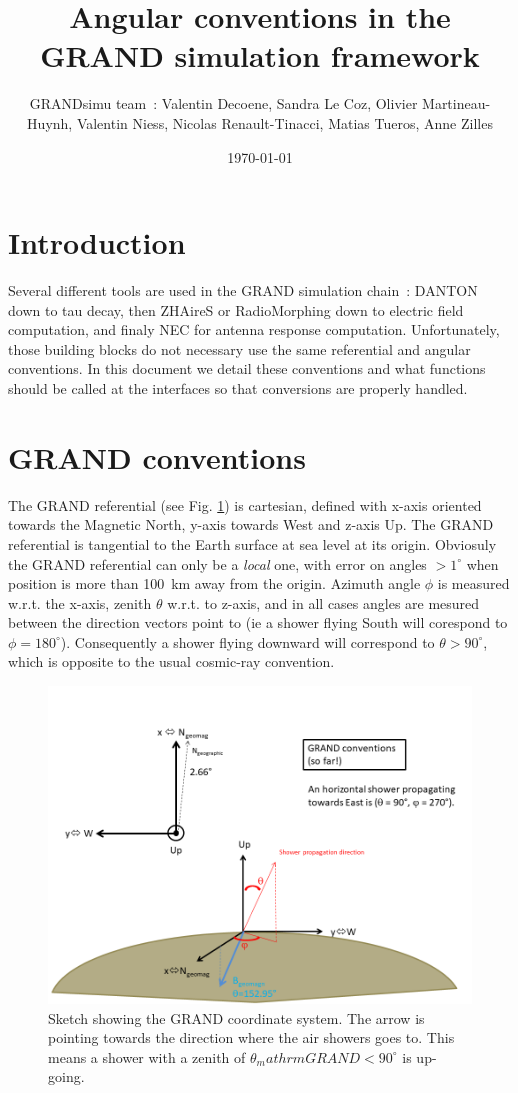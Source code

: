 \documentclass[12pt]{article}
\title{Angular conventions in the GRAND simulation framework}
\author{GRANDsimu team~: Valentin Decoene, Sandra Le Coz, Olivier Martineau-Huynh, Valentin Niess, Nicolas Renault-Tinacci, Matias Tueros, Anne Zilles}
\date{\today}
\begin{document}
\maketitle
\section{Introduction}
Several different tools are used in the GRAND simulation chain~: DANTON down to tau decay, then ZHAireS or RadioMorphing down to electric field computation, and finaly NEC for antenna response computation. Unfortunately, those building blocks do not necessary use the same referential and angular conventions. In this document we detail these conventions and what functions should be called at the interfaces so that conversions are properly handled.

\section{GRAND conventions}  \label{sec:grand}
The GRAND referential (see Fig. \ref{fig:grandref}) is cartesian, defined with x-axis oriented towards the Magnetic North, y-axis towards West and z-axis Up. The GRAND referential is tangential to the Earth surface at sea level at its origin. Obviosuly the GRAND referential can only be a {\it local} one,  with error on angles $>1^{\circ}$ when position is more than 100~km away from the origin. Azimuth angle $\phi$ is measured w.r.t. the x-axis, zenith $\theta$ w.r.t. to z-axis, and in all cases angles are mesured between the direction vectors point to (ie a shower flying South will corespond to $\phi=180^{\circ}$). Consequently a shower flying downward will correspond to $\theta>90^{\circ}$, which is opposite to the usual cosmic-ray convention. 
%
\begin{figure}[ht]
\centering
\includegraphics[width=\textwidth]{GRANDreferential.png} 
\caption{\label{fig:grandref} Sketch showing the GRAND coordinate system. The arrow is pointing towards the direction where the air showers goes to. This means a shower with a zenith of $\theta_mathrm{GRAND}<90^\circ$ is up-going.}
\end{figure} 
\end{document}
